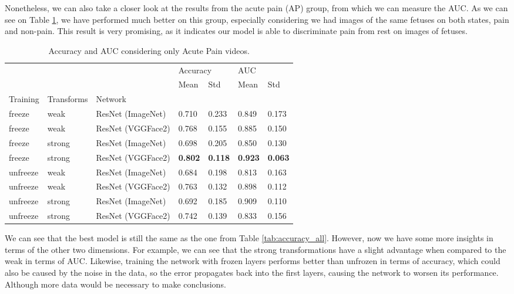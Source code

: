 Nonetheless, we can also take a closer look at the results from the acute pain (AP) group, from which we can measure the AUC. As we can see on Table \ref{tab:accuracy_auc_ap}, we have performed much better on this group, especially considering we had images of the same fetuses on both states, pain and non-pain. This result is very promising, as it indicates our model is able to discriminate pain from rest on images of fetuses.

\begin{table}[h!tp]
\centering
\caption{Accuracy and AUC considering only Acute Pain videos.}
\label{tab:accuracy_auc_ap}
\begin{tabular}{lllllll}
\toprule
         &        &          & \multicolumn{2}{l}{Accuracy} & \multicolumn{2}{l}{AUC} \\
         &        &          &      Mean &       Std &      Mean &       Std \\
Training & Transforms & Network &           &           &           &           \\
\midrule
freeze   & weak   & ResNet (ImageNet) &  0.710 &  0.233 &  0.849 &  0.173 \\
freeze   & weak   & ResNet (VGGFace2) &  0.768 &  0.155 &  0.885 &  0.150 \\
freeze   & strong & ResNet (ImageNet) &  0.698 &  0.205 &  0.850 &  0.130 \\
freeze   & strong & ResNet (VGGFace2) &  \textbf{0.802} & \textbf{ 0.118} &  \textbf{0.923} &  \textbf{0.063} \\
unfreeze & weak   & ResNet (ImageNet) &  0.684 &  0.198 &  0.813 &  0.163 \\
unfreeze & weak   & ResNet (VGGFace2) &  0.763 &  0.132 &  0.898 &  0.112 \\
unfreeze & strong & ResNet (ImageNet) &  0.692 &  0.185 &  0.909 &  0.110 \\
unfreeze & strong & ResNet (VGGFace2) &  0.742 &  0.139 &  0.833 &  0.156 \\
\bottomrule
\end{tabular}
\end{table}

We can see that the best model is still the same as the one from Table \ref{tab:accuracy_all}. However, now we have some more insights in terms of the other two dimensions. For example, we can see that the strong transformations have a slight advantage when compared to the weak in terms of AUC. Likewise, training the network with frozen layers performs better than unfrozen in terms of accuracy, which could also be caused by the noise in the data, so the error propagates back into the first layers, causing the network to worsen its performance. Although more data would be necessary to make conclusions.

